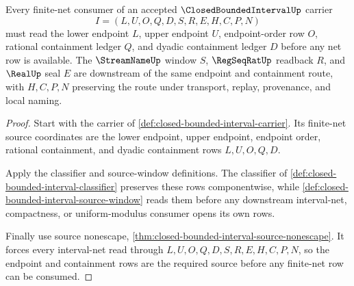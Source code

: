 \begin{theorem}
\label{thm:closed-bounded-interval-finite-net-source}
Every finite-net consumer of an accepted $\ClosedBoundedIntervalUp$ carrier
$$
I=(L,U,O,Q,D,S,R,E,H,C,P,N)
$$
must read the lower endpoint $L$, upper endpoint $U$, endpoint-order row $O$, rational containment ledger $Q$, and dyadic containment ledger $D$ before any net row is available. The $\StreamNameUp$ window $S$, $\RegSeqRatUp$ readback $R$, and $\RealUp$ seal $E$ are downstream of the same endpoint and containment route, with $H,C,P,N$ preserving the route under transport, replay, provenance, and local naming.
\end{theorem}
\begin{proof}
Start with the carrier of \autoref{def:closed-bounded-interval-carrier}. Its finite-net source coordinates are the lower endpoint, upper endpoint, endpoint order, rational containment, and dyadic containment rows $L,U,O,Q,D$.

Apply the classifier and source-window definitions. The classifier of \autoref{def:closed-bounded-interval-classifier} preserves these rows componentwise, while \autoref{def:closed-bounded-interval-source-window} reads them before any downstream interval-net, compactness, or uniform-modulus consumer opens its own rows.

Finally use source nonescape, \autoref{thm:closed-bounded-interval-source-nonescape}. It forces every interval-net read through $L,U,O,Q,D,S,R,E,H,C,P,N$, so the endpoint and containment rows are the required source before any finite-net row can be consumed.
\end{proof}

